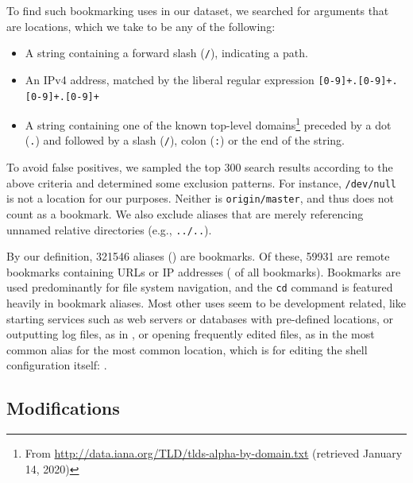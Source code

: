 To find such bookmarking uses in our dataset, we searched for arguments that are locations, which we take to be any of the following:
\begin{itemize}
    \item A string containing a forward slash (\verb|/|), indicating a path.
    \item An IPv4 address, matched by the liberal regular expression \verb|[0-9]+.[0-9]+.[0-9]+.[0-9]+|
    \item A string containing one of the known top-level domains\footnote{From \url{http://data.iana.org/TLD/tlds-alpha-by-domain.txt} (retrieved January 14, 2020)} preceded by a dot (\verb|.|) and followed by a slash (\verb|/|), colon (\verb|:|) or the end of the string.
\end{itemize}
To avoid false positives, we sampled the top 300 search results according to the above criteria and determined some exclusion patterns.
For instance, \texttt{/dev/null} is not a location for our purposes.
Neither is \texttt{origin/master}, and thus  does not count as a bookmark.
We also exclude aliases that are merely referencing unnamed relative directories (e.g., \verb|../..|).

By our definition, \num{321546} aliases () are bookmarks.
Of these, \num{59931} are remote bookmarks containing URLs or IP addresses ( of all bookmarks).
Bookmarks are used predominantly for file system navigation, and the \verb|cd| command is featured heavily in bookmark aliases.
Most other uses seem to be development related, like starting services such as web servers or databases with pre-defined locations,
or outputting log files, as in , or opening frequently edited files, as in the most common alias for the most common location, which is for editing the shell configuration itself: .

%     

\subsection{Modifications}

